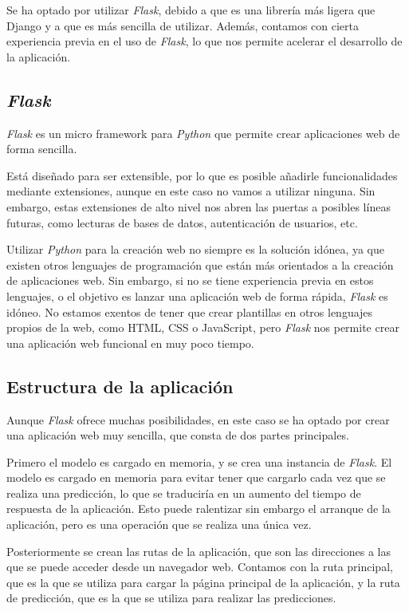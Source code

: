 Se ha optado por utilizar \textit{Flask}, debido a que es una librería más ligera que Django y a que es más sencilla de utilizar.
Además, contamos con cierta experiencia previa en el uso de \textit{Flask}, lo que nos permite acelerar el desarrollo de la aplicación.


\subsection{\textit{Flask}}
\textit{Flask} es un micro framework para \textit{Python} que permite crear aplicaciones web de forma sencilla.

Está diseñado para ser extensible, por lo que es posible añadirle funcionalidades mediante extensiones, aunque en este caso no vamos a utilizar ninguna.
Sin embargo, estas extensiones de alto nivel nos abren las puertas a posibles líneas futuras, como lecturas de bases de datos, autenticación de usuarios, etc.

Utilizar \textit{Python} para la creación web no siempre es la solución idónea, ya que existen otros lenguajes de programación que están más orientados a la creación de aplicaciones web.
Sin embargo, si no se tiene experiencia previa en estos lenguajes, o el objetivo es lanzar una aplicación web de forma rápida, \textit{Flask} es idóneo.
No estamos exentos de tener que crear plantillas en otros lenguajes propios de la web, como HTML, CSS o JavaScript, pero \textit{Flask} nos permite crear una aplicación web funcional en muy poco tiempo.


\subsection{Estructura de la aplicación}
Aunque \textit{Flask} ofrece muchas posibilidades, en este caso se ha optado por crear una aplicación web muy sencilla, que consta de dos partes principales.

Primero el modelo es cargado en memoria, y se crea una instancia de \textit{Flask}.
El modelo es cargado en memoria para evitar tener que cargarlo cada vez que se realiza una predicción, lo que se traduciría en un aumento del tiempo de respuesta de la aplicación.
Esto puede ralentizar sin embargo el arranque de la aplicación, pero es una operación que se realiza una única vez.

Posteriormente se crean las rutas de la aplicación, que son las direcciones a las que se puede acceder desde un navegador web.
Contamos con la ruta principal, que es la que se utiliza para cargar la página principal de la aplicación, y la ruta de predicción, que es la que se utiliza para realizar las predicciones.


